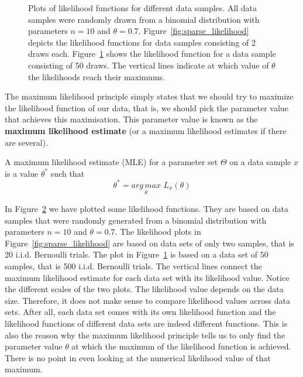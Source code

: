 \begin{figure}
\begin{subfigure}{\textwidth}
\caption{}
\label{fig:dense_likelihood} 
\end{subfigure}
\caption{Plots of likelihood functions for different data samples. All data samples were randomly drawn
from a binomial distribution with parameters $ n=10 $ and $ \theta=0.7 $. Figure~\ref{fig:sparse_likelihood}
depicts the likelihood functions for data samples consisting of 2 draws each. 
Figure~\ref{fig:dense_likelihood}
shows the likelihood function for a data sample consisting of 50 draws. The vertical lines indicate
at which value of $ \theta $ the likelihoods reach their maximums.}
\label{fig:likelihood_plots}
\end{figure}

The maximum likelihood principle simply states that we should try to maximize the likelihood function of
our data, that is, we should pick the parameter value that achieves this maximisation. This parameter value
is known as the \textbf{maximum likelihood estimate} (or a maximum likelihood estimates if there are several). 

\begin{Definition}
A maximum likelihood estimate (MLE) for a parameter set $ \Theta $ on a data sample $ x $ 
is a value $ \theta^{*} $ such that
$$ \theta^{*} = \underset{\theta}{arg\,max}\, \, L_{x}(\theta) $$
\end{Definition}

In Figure~\ref{fig:likelihood_plots} we have plotted some likelihood functions. They are based on data
samples that were randomly generated from a binomial distribution with parameters $ n=10 $ and 
$ \theta=0.7 $. The likelihood plots in Figure~\ref{fig:sparse_likelihood} are based on data sets of only
two samples, that is 20 i.i.d. Bernoulli trials. The plot in Figure~\ref{fig:dense_likelihood} is based on a 
data set of 50 samples, that is 500 i.i.d. Bernoulli trials. 
The vertical lines connect the maximum likelihood estimate
for each data set with its likelihood value. Notice the different scales of the two plots. The likelihood value depends on the
data size. Therefore, it does not make sense to compare likelihood values across data sets. After all, each data set comes with its own
likelihood function and the likelihood functions of different data sets are indeed different functions. This is also the
reason why the maximum likelihood principle tells us to only find the parameter value $ \theta $ at which the maximum of the
likelihood function is achieved. There is no point in even looking at the numerical likelihood value of that maximum.

